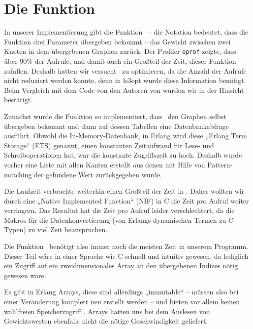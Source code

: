 \section{Die Funktion \gtwght}
\label{sec:get-weight}

In unserer Implementierung gibt die Funktion \gtwght\ – die Notation
bedeutet, dass die Funktion drei Parameter übergeben bekommt – das
Gewicht zwischen zwei Knoten in dem übergebenen Graphen zurück.  Der Profiler
\lstinline!eprof!  zeigte, dass über 90\% der Aufrufe, und damit auch
ein Großteil der Zeit, dieser Funktion zufallen.  Deshalb hatten wir
versucht \gtwght\ zu optimieren, da die Anzahl der Aufrufe nicht
reduziert werden konnte, denn in ls3opt wurde diese Information
benötigt.  Beim Vergleich mit dem Code von den Autoren von \cite{gapx}
wurden wir in der Hinsicht bestätigt. %

Zunächst wurde die Funktion so implementiert, dass \gtwght\ den
Graphen selbst übergeben bekommt und dann auf dessen Tabellen eine
Datenbankabfrage ausführt.  Obwohl die In-Memory-Datenbank, in Erlang
wird diese „Erlang Term Storage“ (ETS) genannt, einen konstanten
Zeitaufwand für Lese- und Schreiboperationen hat, war die konstante
Zugriffszeit zu hoch.  Deshalb wurde vorher eine Liste mit allen
Kanten erstellt aus denen mit Hilfe von Pattern-matching der gefundene
Wert zurückgegeben wurde.  

Die Laufzeit verbrachte weiterhin einen Großteil der Zeit in \gtwght.
Daher wollten wir durch eine „Native Implemented Function“ (NIF) in C
die Zeit pro Aufruf weiter verringern.  Das Resultat hat die Zeit pro
Aufruf leider verschlechtert, da die Makros für die Datenkonvertierung
(von Erlangs dynamischen Termen zu C-Typen) zu viel Zeit beanspruchen.

Die Funktion \gtwght\ benötigt also immer noch die meisten Zeit in
unserem Programm.  Dieser Teil wäre in einer Sprache wie C schnell und
intuitiv gewesen, da lediglich ein Zugriff auf ein zweidimensionales
Array an den übergebenen Indizes nötig gewesen wäre.

Es gibt in Erlang Arrays, diese sind allerdings „immutable“ – müssen
also bei einer Veränderung komplett neu erstellt werden – und bieten
vor allem keinen wahlfreien Speicherzugriff \cite[Kapitel~11]{lyse}.
Arrays hätten uns bei dem Auslesen von Gewichtswerten ebenfalls nicht die
nötige Geschwindigkeit geliefert. %
